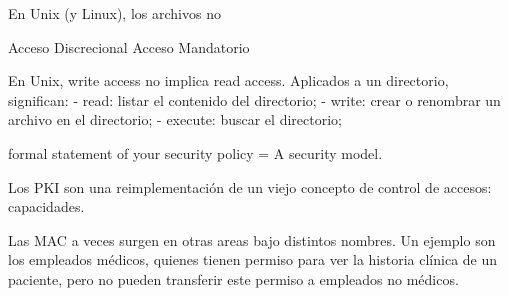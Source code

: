 \documentclass{article}
\theoremstyle{definition}
\begin{document}
En Unix (y Linux), los archivos no


Acceso Discrecional
Acceso Mandatorio

En Unix, write access no implica read access. Aplicados a un directorio,
significan:
- read: listar el contenido del directorio;
- write: crear o renombrar un archivo en el directorio;
- execute: buscar el directorio;

formal statement of your security policy = A security model.

Los PKI son una reimplementación de un viejo concepto de control de accesos:
capacidades.

Las MAC a veces surgen en otras areas bajo distintos nombres. Un ejemplo son los
empleados médicos, quienes tienen permiso para ver la historia clínica de un
paciente, pero no pueden transferir este permiso a empleados no médicos.

\iffalse
\section{Biba: Modelo de Integridad}
\subsection{Low-water mark}
\subsection{Política Anillo}
\subsection{Integridad Estricta}
\section{Muralla China: Modelo híbrido}
\fi



\end{document}
